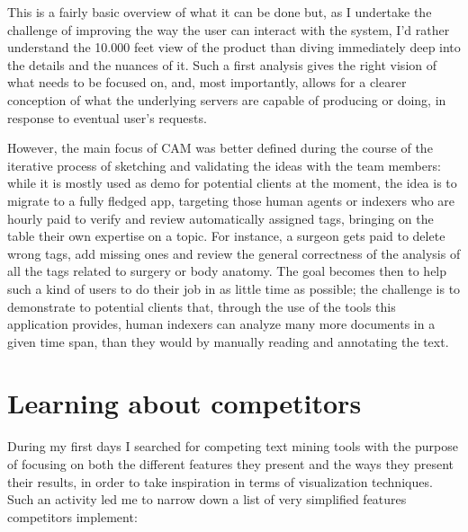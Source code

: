 \documentclass[12pt,oneside,svgnames]{memoir}
\begin{document}
This is a fairly basic overview of what it can be done but, as I
undertake the challenge of improving the way the user can interact with
the system, I'd rather understand the 10.000 feet view of the product
than diving immediately deep into the details and the nuances of it.
Such a first analysis gives the right vision of what needs to be focused
on, and, most importantly, allows for a clearer conception of what the
underlying servers are capable of producing or doing, in response to
eventual user's requests.

However, the main focus of CAM was better defined during the course of
the iterative process of sketching and validating the ideas with the
team members: while it is mostly used as demo for potential clients at
the moment, the idea is to migrate to a fully fledged app, targeting
those human agents or indexers who are hourly paid to verify and review
automatically assigned tags, bringing on the table their own expertise
on a topic. For instance, a surgeon gets paid to delete wrong tags, add
missing ones and review the general correctness of the analysis of all
the tags related to surgery or body anatomy. The goal becomes then to
help such a kind of users to do their job in as little time as possible;
the challenge is to demonstrate to potential clients that, through the
use of the tools this application provides, human indexers can analyze
many more documents in a given time span, than they would by manually
reading and annotating the text.

\section{Learning about competitors}\label{learning-about-competitors}

During my first days I searched for competing text mining tools with the
purpose of focusing on both the different features they present and the
ways they present their results, in order to take inspiration in terms
of visualization techniques. Such an activity led me to narrow down a
list of very simplified features competitors implement:
\end{document}

